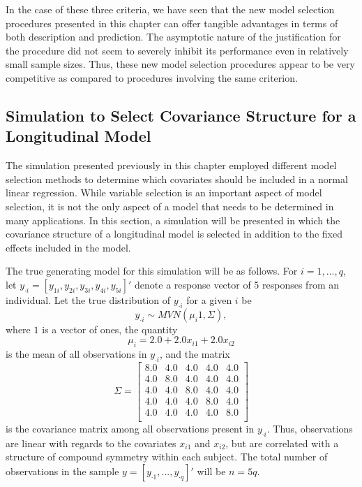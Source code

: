 		In the case of these three criteria, we have seen that the new model selection procedures presented in this chapter can offer tangible advantages in terms of both description
		and prediction. The asymptotic nature of the justification for the procedure did not seem to severely inhibit its performance even in relatively small sample sizes. Thus, these new model selection procedures appear to be very competitive as compared to
		procedures involving the same criterion.

		\subsection{Simulation to Select Covariance Structure for a Longitudinal Model}

		The simulation presented previously in this chapter employed different model selection methods to determine which covariates should be included in a normal linear regression.
		While variable selection is an important aspect of model selection, it is not the only aspect of a model that needs to be determined in many applications. In this section, a simulation will be presented
		in which the covariance structure of a longitudinal model is selected in addition to the fixed effects included in the model.

		The true generating model for this simulation will be as follows. For $i = 1,...,q$, let $y_{\cdot i} = [y_{1 i},y_{2 i},y_{3 i},y_{4 i},y_{5 i}]'$ denote a response vector of 5
		responses from an individual. Let the true distribution of $y_{\cdot i}$ for a given $i$ be
		\begin{equation*}
			y_{\cdot i} \sim MVN( \mu_i 1, \Sigma) ,
		\end{equation*}
		where $1$ is a vector of ones, the quantity
		\begin{equation*}
			\mu_i = 2.0 + 2.0 x_{i1} + 2.0 x_{i2}
		\end{equation*}
		is the mean of all observations in $y_{\cdot i}$, and the matrix
		\begin{equation*}
			\Sigma = 
			\begin{bmatrix}
				8.0 & 4.0 & 4.0 & 4.0 & 4.0 \\
				4.0 & 8.0 & 4.0 & 4.0 & 4.0 \\
				4.0 & 4.0 & 8.0 & 4.0 & 4.0 \\
				4.0 & 4.0 & 4.0 & 8.0 & 4.0 \\
				4.0 & 4.0 & 4.0 & 4.0 & 8.0 \\
			\end{bmatrix}
		\end{equation*}
		is the covariance matrix among all observations present in $y_{\cdot i}$. Thus, observations are linear with regards to the covariates $x_{i1}$ and $x_{i2}$, but are correlated
		with a structure of compound symmetry within each subject. The total number of observations in the sample $y = [y_{\cdot 1},...,y_{\cdot q}]'$ will be $n = 5q$.

